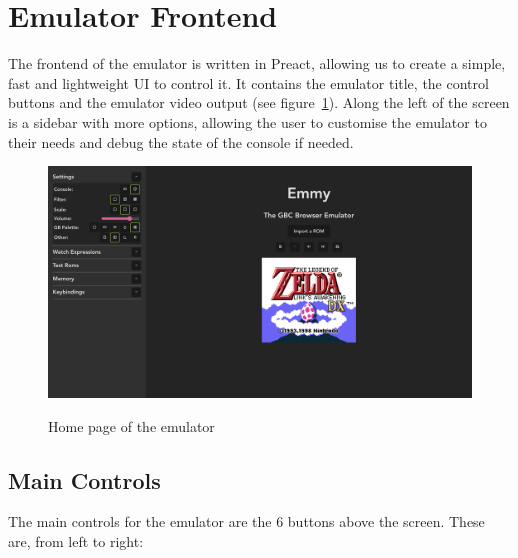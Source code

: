 \documentclass[11pt]{report}
\begin{document}
\section{Emulator Frontend}

The frontend of the emulator is written in Preact, allowing us to create a simple, fast and lightweight UI to control it. It contains the emulator title, the control buttons and the emulator video output (see figure~\ref{fig:emmy-home}). Along the left of the screen is a sidebar with more options, allowing the user to customise the emulator to their needs and debug the state of the console if needed.

\begin{figure}[h]
    \centering
    \includegraphics[width=15cm]{images/emmy-home-page}\\
    \caption{Home page of the emulator}
    \label{fig:emmy-home}
\end{figure}

\subsection{Main Controls}

The main controls for the emulator are the 6 buttons above the screen. These are, from left to right:
\end{document}
